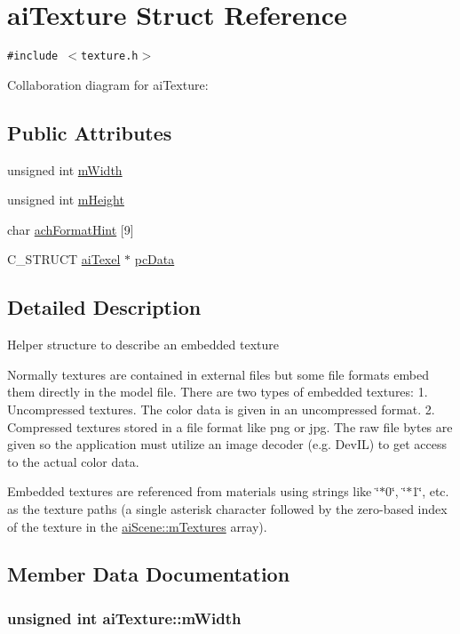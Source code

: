 \hypertarget{structai_texture}{
\section{aiTexture Struct Reference}
\label{structai_texture}
}
{\tt \#include $<$texture.h$>$}

Collaboration diagram for aiTexture:\subsection*{Public Attributes}
\begin{CompactItemize}
\item 
unsigned int \hyperlink{structai_texture_aa3ad8cfe44fdc4dea2db91977d92234}{mWidth}
\item 
unsigned int \hyperlink{structai_texture_c1e2fa6f1f646e9c55e3985d4418a752}{mHeight}
\item 
char \hyperlink{structai_texture_8e281d19486df620af1b2869464fa5c0}{achFormatHint} \mbox{[}9\mbox{]}
\item 
C\_\-STRUCT \hyperlink{structai_texel}{aiTexel} $\ast$ \hyperlink{structai_texture_eb07528748b6e49d2d81c60006024f9a}{pcData}
\end{CompactItemize}


\subsection{Detailed Description}
Helper structure to describe an embedded texture

Normally textures are contained in external files but some file formats embed them directly in the model file. There are two types of embedded textures: 1. Uncompressed textures. The color data is given in an uncompressed format. 2. Compressed textures stored in a file format like png or jpg. The raw file bytes are given so the application must utilize an image decoder (e.g. DevIL) to get access to the actual color data.

Embedded textures are referenced from materials using strings like \char`\"{}$\ast$0\char`\"{}, \char`\"{}$\ast$1\char`\"{}, etc. as the texture paths (a single asterisk character followed by the zero-based index of the texture in the \hyperlink{structai_scene_0fd0d29fbc439e3715b4975ccb68d2d3}{aiScene::mTextures} array). 

\subsection{Member Data Documentation}
\hypertarget{structai_texture_aa3ad8cfe44fdc4dea2db91977d92234}{
\subsubsection[mWidth]{\setlength{\rightskip}{0pt plus 5cm}unsigned int {\bf aiTexture::mWidth}}}
\label{structai_texture_aa3ad8cfe44fdc4dea2db91977d92234}


